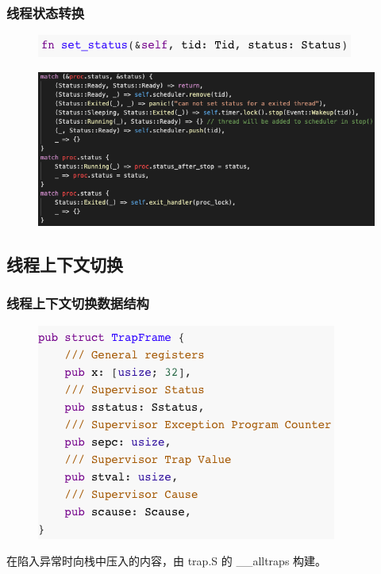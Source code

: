 \begin{frame}[fragile]
    \frametitle{线程状态转换}
    \begin{figure}
    \includegraphics[width=0.6\linewidth]{figs/fn-set-status.png}
    \end{figure}

    \begin{figure}
    \includegraphics[width=0.8\linewidth]{figs/set-status.png}
    \end{figure}

\end{frame}
% 
% 
% 
% 
\subsection{线程上下文切换} %
\begin{frame}[fragile]
    \frametitle{线程上下文切换数据结构}
    \begin{figure}
    \includegraphics[width=0.5\linewidth]{figs/struct-TrapFrame.png}
    \end{figure}

在陷入异常时向栈中压入的内容，由 trap.S 的 \_\_alltraps 构建。

\end{frame}

